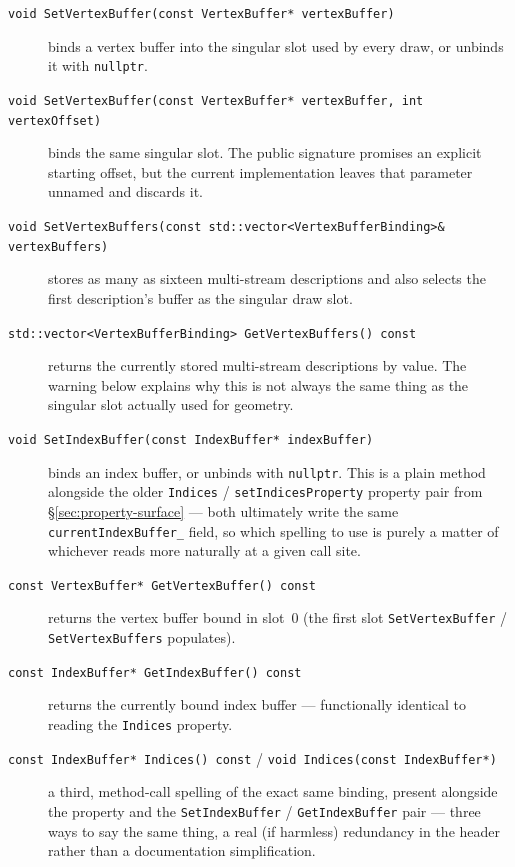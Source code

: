 \begin{description}
\item[\texttt{void SetVertexBuffer(const VertexBuffer* vertexBuffer)}] binds a vertex buffer
  into the singular slot used by every draw, or unbinds it with \texttt{nullptr}.
\item[\texttt{void SetVertexBuffer(const VertexBuffer* vertexBuffer, int vertexOffset)}] binds
  the same singular slot. The public signature promises an explicit starting offset, but the
  current implementation leaves that parameter unnamed and discards it.
\item[\texttt{void SetVertexBuffers(const std::vector<VertexBufferBinding>\& vertexBuffers)}]
  stores as many as sixteen multi-stream descriptions and also selects the first description's
  buffer as the singular draw slot.
\item[\texttt{std::vector<VertexBufferBinding> GetVertexBuffers() const}] returns the currently
  stored multi-stream descriptions by value. The warning below explains why this is not always
  the same thing as the singular slot actually used for geometry.
\item[\texttt{void SetIndexBuffer(const IndexBuffer* indexBuffer)}] binds an index buffer, or
  unbinds with \texttt{nullptr}. This is a plain method alongside the older
  \texttt{Indices} / \texttt{setIndicesProperty} property pair from
  \S\ref{sec:property-surface} --- both ultimately write the same
  \texttt{currentIndexBuffer\_} field, so which spelling to use is purely a matter of whichever
  reads more naturally at a given call site.
\item[\texttt{const VertexBuffer* GetVertexBuffer() const}] returns the vertex buffer bound in
  slot~0 (the first slot \texttt{SetVertexBuffer} / \texttt{SetVertexBuffers} populates).
\item[\texttt{const IndexBuffer* GetIndexBuffer() const}] returns the currently bound index
  buffer --- functionally identical to reading the \texttt{Indices} property.
\item[\texttt{const IndexBuffer* Indices() const} / \texttt{void Indices(const IndexBuffer*)}]
  a third, method-call spelling of the exact same binding, present alongside the property and
  the \texttt{SetIndexBuffer} / \texttt{GetIndexBuffer} pair --- three ways to say the same thing,
  a real (if harmless) redundancy in the header rather than a documentation simplification.
\end{description}

